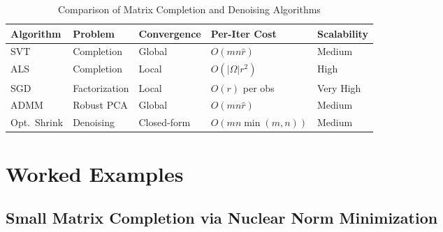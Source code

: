 \documentclass[conference]{IEEEtran}
\begin{document}
\begin{table}[htbp]
  \centering
  \caption{Comparison of Matrix Completion and Denoising Algorithms}
  \label{tab:algo_compare}
  \renewcommand{\arraystretch}{1.3}
  \begin{tabular}{@{}lllll@{}}
    \toprule
    \textbf{Algorithm} & \textbf{Problem} & \textbf{Convergence} & \textbf{Per-Iter Cost} & \textbf{Scalability} \\
    \midrule
    SVT \cite{cai2010singular} & Completion & Global & $O(mn\hat{r})$ & Medium \\
    ALS \cite{jain2013low} & Completion & Local & $O(|\Omega| r^2)$ & High \\
    SGD \cite{koren2009matrix} & Factorization & Local & $O(r)$ per obs & Very High \\
    ADMM \cite{lin2010augmented} & Robust PCA & Global & $O(mn\hat{r})$ & Medium \\
    Opt.\ Shrink \cite{gavish2014optimal} & Denoising & Closed-form & $O(mn\min(m,n))$ & Medium \\
    \bottomrule
  \end{tabular}
\end{table}

\section{Worked Examples}
\label{sec:examples}

\subsection{Small Matrix Completion via Nuclear Norm Minimization}
\end{document}
